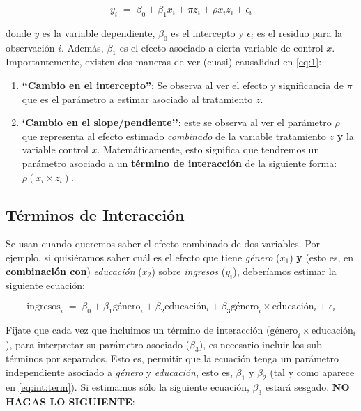 \documentclass[10pt]{article}
\begin{document}
\begin{equation}\label{eq:1}
y_{i} \;=\; \beta_{0} + \beta_{1}x_{i} + \pi z_{i} + \rho x_{i}z_{i} + \epsilon_{i}
\end{equation}

donde $y$ es la variable dependiente, $\beta_{0}$ es el intercepto y $\epsilon_{i}$ es el residuo para la observaci\'on $i$. Adem\'as, $\beta_{1}$ es el efecto asociado a cierta variable de control $x$. Importantemente, existen dos maneras de ver (cuasi) causalidad en \autoref{eq:1}:

\begin{enumerate}
	\item {\bf ``Cambio en el intercepto''}: Se observa al ver el efecto y significancia de $\pi$ que es el par\'ametro a estimar asociado al tratamiento $z$.

	\item  {\bf `Cambio en el slope/pendiente''}: este se observa al ver el par\'ametro $\rho$ que representa al efecto estimado \emph{combinado} de la variable tratamiento $z$ {\bf y} la variable control $x$. Matem\'aticamente, esto significa que tendremos un par\'ametro asociado a un {\bf t\'ermino de interacci\'on} de la siguiente forma: $\rho(x_{i}\times z_{i})$. 
\end{enumerate}

\subsection*{T\'erminos de Interacci\'on}

Se usan cuando queremos saber el efecto combinado de dos variables. Por ejemplo, si quisi\'eramos saber cu\'al es el efecto que tiene \emph{g\'enero} ($x_{1}$) {\bf y} (esto es, en {\bf combinaci\'on con}) \emph{educaci\'on} ($x_{2}$) sobre \emph{ingresos} ($y_{i}$), deber\'iamos estimar la siguiente ecuaci\'on:

		\begin{equation}\label{eq:int:term}
			\text{ingresos}_{i} \;=\; \beta_{0} + \beta_{1}\text{g\'enero}_{i} + \beta_{2}\text{educaci\'on}_{i} + \beta_{3}{\text{g\'enero}}_{i}\times \text{educaci\'on}_{i} + \epsilon_{i}
		\end{equation}

F\'ijate que cada vez que incluimos un t\'ermino de interacci\'on (${\text{g\'enero}}_{i}\times \text{educaci\'on}_{i}$), para interpretar su par\'ametro asociado ($\beta_{3}$), es necesario incluir los sub-t\'erminos por separados. Esto es, permitir que la ecuaci\'on tenga un par\'ametro independiente asociado a \emph{g\'enero} y \emph{educaci\'on}, esto es, $\beta_{1}$ y $\beta_{2}$ (tal y como aparece en \autoref{eq:int:term}). Si estimamos s\'olo la siguiente ecuaci\'on, $\beta_{3}$ estar\'a sesgado. {\bf NO HAGAS LO SIGUIENTE}:
\end{document}
